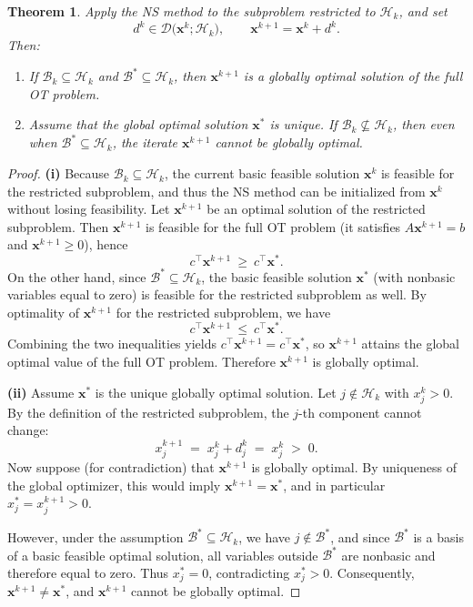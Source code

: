 \documentclass[10pt,a4paper]{amsart}
\newtheorem{theorem}{Theorem}
\begin{document}
\begin{theorem}\label{thm:NS-global}
Apply the NS method to the subproblem restricted to \(\mathcal H_{k}\), and set
\[
d^{k}\in\mathcal D\bigl(\mathbf{x}^{k};\mathcal H_{k}\bigr),
\qquad
\mathbf{x}^{k+1}=\mathbf{x}^{k}+d^{k}.
\]
Then:
\begin{enumerate}
  \item[\textnormal{(i)}]
  If \(\mathcal B_k\subseteq \mathcal H_k\) and \(\mathcal B^\ast\subseteq \mathcal H_k\),
  then \(\mathbf{x}^{k+1}\) is a globally optimal solution of the full OT problem.

  \item[\textnormal{(ii)}]
  Assume that the global optimal solution \(\mathbf{x}^\ast\) is \emph{unique}.
  If \(\mathcal{B}_{k}\not\subseteq\mathcal H_{k}\),
  then even when \(\mathcal B^\ast\subseteq \mathcal H_k\),
  the iterate \(\mathbf{x}^{k+1}\) cannot be globally optimal.
\end{enumerate}
\end{theorem}

\begin{proof}
\medskip
\noindent\textbf{(i)}
Because \(\mathcal B_k\subseteq \mathcal H_k\), the current basic feasible solution
\(\mathbf{x}^k\) is feasible for the restricted subproblem, and thus the NS method can be
initialized from \(\mathbf{x}^k\) without losing feasibility.
Let \(\mathbf{x}^{k+1}\) be an optimal solution of the restricted subproblem.
Then \(\mathbf{x}^{k+1}\) is feasible for the full OT problem (it satisfies \(A\mathbf{x}^{k+1}=b\) and
\(\mathbf{x}^{k+1}\ge 0\)), hence
\[
c^\top \mathbf{x}^{k+1}\ \ge\ c^\top \mathbf{x}^\ast.
\]
On the other hand, since \(\mathcal B^\ast\subseteq \mathcal H_k\), the basic feasible solution
\(\mathbf{x}^\ast\) (with nonbasic variables equal to zero) is feasible for the restricted subproblem as well.
By optimality of \(\mathbf{x}^{k+1}\) for the restricted subproblem, we have
\[
c^\top \mathbf{x}^{k+1}\ \le\ c^\top \mathbf{x}^\ast.
\]
Combining the two inequalities yields \(c^\top \mathbf{x}^{k+1}=c^\top \mathbf{x}^\ast\), so
\(\mathbf{x}^{k+1}\) attains the global optimal value of the full OT problem. Therefore
\(\mathbf{x}^{k+1}\) is globally optimal.

\medskip
\noindent\textbf{(ii)}
Assume \(\mathbf{x}^\ast\) is the unique globally optimal solution.
Let \(j\notin \mathcal H_k\) with \(x^k_j>0\). By the definition of the restricted subproblem, the \(j\)-th component cannot change:
\[
x^{k+1}_j \;=\; x^k_j + d^k_j \;=\; x^k_j \;>\; 0.
\]
Now suppose (for contradiction) that \(\mathbf{x}^{k+1}\) is globally optimal.
By uniqueness of the global optimizer, this would imply \(\mathbf{x}^{k+1}=\mathbf{x}^\ast\),
and in particular \(x^\ast_j=x^{k+1}_j>0\).

However, under the assumption \(\mathcal B^\ast\subseteq \mathcal H_k\), we have \(j\notin \mathcal B^\ast\),
and since \(\mathcal B^\ast\) is a basis of a basic feasible optimal solution, all variables outside
\(\mathcal B^\ast\) are nonbasic and therefore equal to zero. Thus \(x^\ast_j=0\), contradicting
\(x^\ast_j>0\). Consequently, \(\mathbf{x}^{k+1}\neq \mathbf{x}^\ast\), and \(\mathbf{x}^{k+1}\) cannot be globally optimal.
\end{proof}
\end{document}
